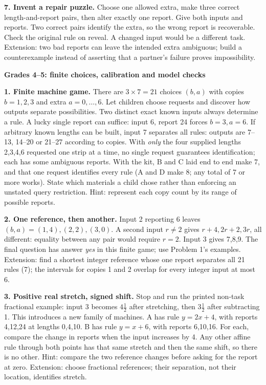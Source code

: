 \documentclass[letterpaper,11pt]{article}
\newcommand{\topic}[1]{\par\medskip\textbf{#1}\par}
\begin{document}
\textbf{7. Invent a repair puzzle.} Choose one allowed extra, make three correct length-and-report pairs, then alter exactly one report. Give both inputs and reports. Two correct pairs identify the extra, so the wrong report is recoverable. Check the original rule on reveal. A changed input would be a different task. Extension: two bad reports can leave the intended extra ambiguous; build a counterexample instead of asserting that a partner's failure proves impossibility.
\newpage
\topic{Grades 4--5: finite choices, calibration and model checks}
\textbf{1. Finite machine game.} There are $3\times7=21$ choices $(b,a)$ with copies $b=1,2,3$ and extra $a=0,\ldots,6$. Let children choose requests and discover how outputs separate possibilities. Two distinct exact known inputs always determine a rule. A lucky single report can suffice: input 6, report 24 forces $b=3,a=6$. If arbitrary known lengths can be built, input 7 separates all rules: outputs are 7--13, 14--20 or 21--27 according to copies. With \emph{only} the four supplied lengths 2,3,4,6 requested one strip at a time, no single request guarantees identification; each has some ambiguous reports. With the kit, B and C laid end to end make 7, and that one request identifies every rule (A and D make 8; any total of 7 or more works). State which materials a child chose rather than enforcing an unstated query restriction. Hint: represent each copy count by its range of possible reports.

\textbf{2. One reference, then another.} Input 2 reporting 6 leaves $(b,a)=(1,4),(2,2),(3,0)$. A second input $r\ne2$ gives $r+4,2r+2,3r$, all different: equality between any pair would require $r=2$. Input 3 gives 7,8,9. The final question has answer \emph{yes} in this finite game; use Problem 1's examples. Extension: find a shortest integer reference whose one report separates all 21 rules (7); the intervals for copies 1 and 2 overlap for every integer input at most 6.

\textbf{3. Positive real stretch, signed shift.} Stop and run the printed non-task fractional example: input 3 becomes $4\tfrac12$ after stretching, then $3\tfrac12$ after subtracting 1. This introduces a new family of machines. A has rule $y=2x+4$, with reports 4,12,24 at lengths 0,4,10. B has rule $y=x+6$, with reports 6,10,16. For each, compare the change in reports when the input increases by 4. Any other affine rule through both points has that same stretch and then the same shift, so there is no other. Hint: compare the two reference changes before asking for the report at zero. Extension: choose fractional references; their separation, not their location, identifies stretch.
\end{document}
